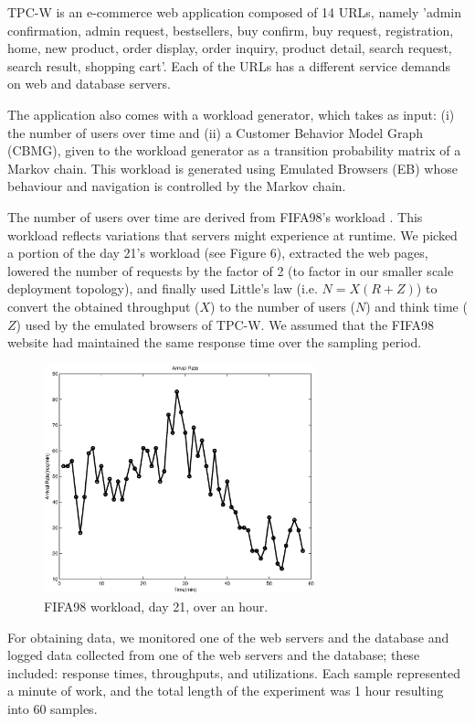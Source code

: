 TPC-W is an e-commerce web application composed of 14 URLs, namely 'admin confirmation, admin request, bestsellers, buy confirm, buy request, registration, home, new product, order display, order inquiry, product detail, search request, search result, shopping cart'.  Each of the URLs has a different service demands on web and database servers. 

The application also comes with a workload generator, which takes as input: (i) the number of users over time and (ii) a Customer Behavior Model Graph (CBMG), given to the workload generator as  a transition probability  matrix of a Markov chain. This workload is generated using Emulated Browsers (EB) whose behaviour and navigation is controlled by the Markov chain.  

The number of users over time are derived from FIFA98's workload \cite{arlitt_workload_2000}. This workload reflects variations that servers might experience at runtime. We picked a portion of the day 21's workload (see Figure 6), extracted the web pages, lowered the number of requests by the factor of 2 (to factor in our smaller scale deployment topology), and finally used Little's law \cite{little1961proof}  (i.e. $N=X(R+Z)$) to convert the obtained throughput ($X$) to the number of users ($N$) and think time ($Z$) used by the emulated browsers of TPC-W. We assumed that the FIFA98 website had maintained the same response time over the sampling period. %

 \begin{figure}[hp]
	\centering
		\includegraphics[width=0.7\textwidth]{image/workload-arr-rate.eps}
	\caption[FIFA98 workload, day 21, over an hour, used in demonstration of the estimation algorithm.]{FIFA98 workload, day 21, over an hour.}
	\label{fig:fig2}
\end{figure}
For obtaining data, we monitored one of the web servers and the database and logged 
data collected from one of the web servers and the database; these included: response times, throughputs, and utilizations. Each sample represented a minute of work, and the total length of the experiment was 1 hour resulting into 60 samples.

